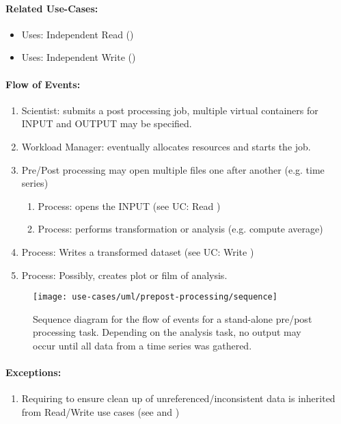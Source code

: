 \paragraph{Related Use-Cases:}
\begin{itemize}
	\item Uses: Independent Read ()
	\item Uses: Independent Write ()
\end{itemize}


\paragraph{Flow of Events:}
\begin{enumerate}
	\item Scientist: submits a post processing job, multiple virtual containers for INPUT and OUTPUT may be specified.
	\item Workload Manager: eventually allocates resources and starts the job.
	\item Pre/Post processing may open multiple files one after another (e.g. time series)
	\begin{enumerate}
	\item Process: opens the INPUT  (see UC: Read )
	\item Process: performs transformation or analysis (e.g. compute average)
	\end{enumerate}
	\item Process: Writes a transformed dataset (see UC: Write )
	\item Process: Possibly, creates plot or film of analysis.
\end{enumerate}


\begin{figure}
	\centering
	\texttt{[image: use-cases/uml/prepost-processing/sequence]}
	\caption{Sequence diagram for the flow of events for a stand-alone pre/post processing task. Depending on the analysis task, no output may occur until all data from a time series was gathered.}
	\label{fig:sequence pre + post processing}
\end{figure}



\paragraph{Exceptions:}
\begin{enumerate}
	\item  Requiring to ensure clean up of unreferenced/inconsistent data is inherited from Read/Write use cases (see  and )
\end{enumerate}



